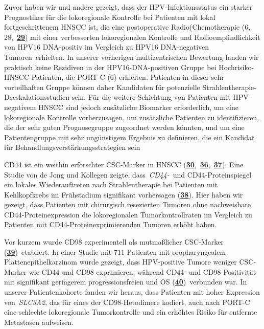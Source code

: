 Zuvor haben wir und andere gezeigt, dass der HPV-Infektionsstatus ein starker Prognostiker für die lokoregionale Kontrolle bei Patienten mit lokal fortgeschrittenem HNSCC ist, die eine postoperative Radio(Chemotherapie (6, 28,~\textbf{\href{https://clincancerres.aacrjournals.org/content/22/11/2639\#ref-29}{29}}) mit einer verbesserten lokoregionalen Kontrolle und Radioempfindlichkeit von HPV16 DNA-positiv im Vergleich zu HPV16 DNA-negativen Tumoren~erhielten. In unserer vorherigen multizentrischen Bewertung fanden wir praktisch keine Rezidiven in der HPV16-DNA-positiven Gruppe bei Hochrisiko-HNSCC-Patienten, die PORT-C (6) erhielten. Patienten in dieser sehr vorteilhaften Gruppe können daher Kandidaten für potenzielle Strahlentherapie-Deeskalationsstudien sein. Für die weitere Schichtung von Patienten mit HPV-negativem HNSCC sind jedoch zusätzliche Biomarker erforderlich, um eine lokoregionale Kontrolle vorherzusagen, um zusätzliche Patienten zu identifizieren, die der sehr guten Prognosegruppe zugeordnet werden könnten, und um eine Patientengruppe mit sehr ungünstigem Ergebnis zu definieren, die ein Kandidat für Behandlungsverstärkungsstrategien sein

CD44 ist ein weithin erforschter CSC-Marker in HNSCC (\textbf{\href{https://clincancerres.aacrjournals.org/content/22/11/2639\#ref-30}{30}},~\textbf{\href{https://clincancerres.aacrjournals.org/content/22/11/2639\#ref-36}{36}},~\textbf{\href{https://clincancerres.aacrjournals.org/content/22/11/2639\#ref-37}{37}}). Eine Studie von de Jong und Kollegen zeigte, dass~\emph{CD44-}~und CD44-Proteinspiegel ein lokales Wiederauftreten nach Strahlentherapie bei Patienten mit Kehlkopfkrebs im Frühstadium signifikant vorhersagen (\textbf{\href{https://clincancerres.aacrjournals.org/content/22/11/2639\#ref-38}{38}}). Hier haben wir gezeigt, dass Patienten mit chirurgisch resezierten Tumoren ohne nachweisbare CD44-Proteinexpression die lokoregionalen Tumorkontrollraten im Vergleich zu Patienten mit CD44-Proteinexprimierenden Tumoren erhöht haben.

Vor kurzem wurde CD98 experimentell als mutmaßlicher CSC-Marker (\textbf{\href{https://clincancerres.aacrjournals.org/content/22/11/2639\#ref-39}{39}})~etabliert. In einer Studie mit 711 Patienten mit oropharyngealem Plattenepithelkarzinom wurde gezeigt, dass HPV-positive Tumore weniger CSC-Marker wie CD44 und CD98 exprimieren, während CD44- und CD98-Positivität mit signifikant geringerem progressionsfreien und OS (\textbf{\href{https://clincancerres.aacrjournals.org/content/22/11/2639\#ref-40}{40}})~verbunden war. In unserer Patientenkohorte fanden wir heraus, dass Patienten mit hoher Expression von~\emph{SLC3A2}, das für eines der CD98-Hetodimere kodiert, auch nach PORT-C eine schlechte lokoregionale Tumorkontrolle und ein erhöhtes Risiko für entfernte Metastasen aufweisen.

